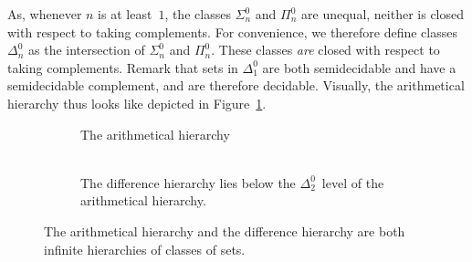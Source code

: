 As, whenever $n$ is at least~$1$, the classes $\Sigma^0_n$ and $\Pi^0_n$ are unequal, neither is closed with respect to taking complements.
For convenience, we therefore define classes $\Delta^0_n$ as the intersection of $\Sigma^0_n$ and $\Pi^0_n$.
These classes \emph{are} closed with respect to taking complements.
Remark that sets in $\Delta^0_1$ are both semidecidable and have a semidecidable complement, and are therefore decidable.
Visually, the arithmetical hierarchy thus looks like depicted in Figure~\ref{fig:arithmetical_hierarchy}.
\begin{figure}
  \centering
  \begin{subfigure}{0.4\textwidth}
    \centering
    \caption{
      The arithmetical hierarchy
      \\\hspace{0pt}\\\hspace{0pt} %
    }
    \label{fig:arithmetical_hierarchy}
  \end{subfigure}
  \qquad
  \begin{subfigure}{0.4\textwidth}
    \centering
    \caption{
      The difference hierarchy lies below the $\Delta^0_2$~level of the arithmetical hierarchy.
    }
    \label{fig:difference_hierarchy}
  \end{subfigure}
  \caption{
    The arithmetical hierarchy and the difference hierarchy are both infinite hierarchies of classes of sets.
  }
\end{figure}

